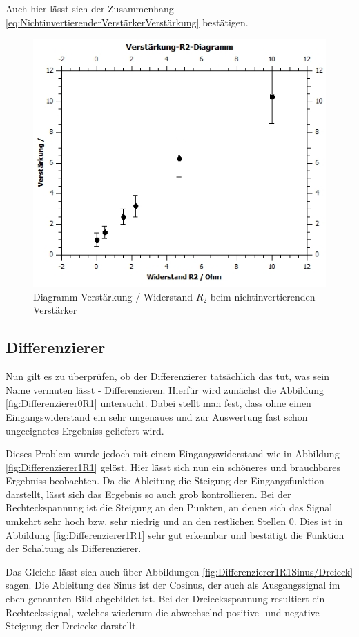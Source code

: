 \documentclass[12pt,a4paper,twoside]{article}
\begin{document}
\noindent
Auch hier lässt sich der Zusammenhang \ref{eq:NichtinvertierenderVerstärkerVerstärkung} bestätigen.

\begin{figure}[H]
    \centering
    \includegraphics[width=0.5\linewidth]{nudes/NivVerstärkungR2Diagramm.jpg}
    \caption{Diagramm Verstärkung / Widerstand $R_{2}$ beim nichtinvertierenden Verstärker}
    \label{fig:Verstärkung/R2NIV}
\end{figure}


\subsection{Differenzierer}

Nun gilt es zu überprüfen, ob der Differenzierer tatsächlich das tut, was sein Name vermuten lässt - Differenzieren. Hierfür wird zunächst die Abbildung \ref{fig:Differenzierer0R1} untersucht.
Dabei stellt man fest, dass ohne einen Eingangswiderstand ein sehr ungenaues und zur Auswertung fast schon ungeeignetes Ergebniss geliefert wird. \newline

\noindent
Dieses Problem wurde jedoch mit einem Eingangswiderstand wie in Abbildung \ref{fig:Differenzierer1R1} gelöst.
Hier lässt sich nun ein schöneres und brauchbares Ergebniss beobachten. Da die Ableitung die Steigung der Eingangsfunktion darstellt, lässt sich das Ergebnis so auch grob kontrollieren. 
Bei der Rechteckspannung ist die Steigung an den Punkten, an denen sich das Signal umkehrt sehr hoch bzw. sehr niedrig und an den restlichen Stellen 0. Dies ist in Abbildung \ref{fig:Differenzierer1R1} sehr gut erkennbar und bestätigt die Funktion der Schaltung als Differenzierer. \newline

\noindent
Das Gleiche lässt sich auch über Abbildungen \ref{fig:Differenzierer1R1Sinus/Dreieck} sagen. Die Ableitung des Sinus ist der Cosinus, der auch als Ausgangssignal im eben genannten Bild abgebildet ist.
Bei der Dreiecksspannung resultiert ein Rechteckssignal, welches wiederum die abwechselnd positive- und negative Steigung der Dreiecke darstellt. 
\end{document}
